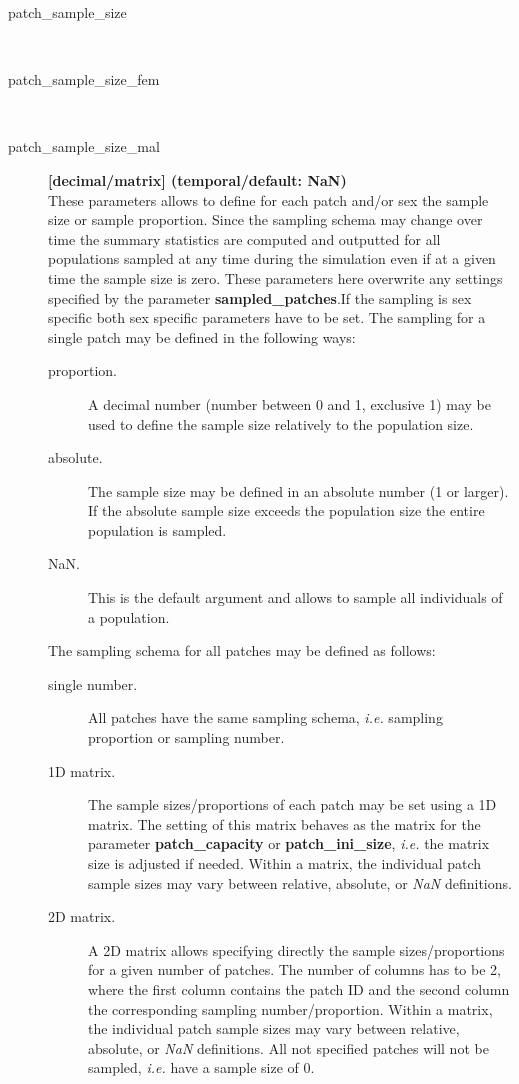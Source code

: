 \documentclass[letterpaper,12pt,oneside]{book}
\begin{document}
\begin{description}
\item[patch\_sample\_size]\hspace*{\fill}\\
\vspace{-9mm}
\item[patch\_sample\_size\_fem]\hspace*{\fill}\\
\vspace{-9mm}
\item[patch\_sample\_size\_mal]\textbf{[decimal/matrix] (temporal/default: NaN)}\\
These parameters allows to define for each patch and/or sex the sample size or sample proportion. Since the sampling schema may change over time the summary statistics are computed and outputted for all populations sampled at any time during the simulation even if at a given time the sample size is zero. These parameters here overwrite any settings specified by the parameter \textbf{sampled\_patches}.If the sampling is sex specific both sex specific parameters have to be set. The sampling for a single patch may be defined in the following ways:
\begin{description}
\item[proportion.] A decimal number (number between 0 and 1, exclusive 1) may be used to define the sample size relatively to the population size.
\item[absolute.] The sample size may be defined in an absolute number (1 or larger). If the absolute sample size exceeds the population size the entire population is sampled. 
\item[NaN.] This is the default argument and allows to sample all individuals of a population.
\end{description}

The sampling schema for all patches may be defined as follows:
\begin{description}
\item[single number.] All patches have the same sampling schema, \textit{i.e.} sampling proportion or sampling number.
\item[1D matrix.] The sample sizes/proportions of each patch may be set using a 1D matrix. The setting of this matrix behaves as the matrix for the parameter \textbf{patch\_capacity} or \textbf{patch\_ini\_size}, \textit{i.e.} the matrix size is adjusted if needed. Within a matrix, the individual patch sample sizes may vary between relative, absolute, or \textit{NaN} definitions. 
\item[2D matrix.] A 2D matrix allows specifying directly the sample sizes/proportions for a given number of patches. The number of columns has to be 2, where the first column contains the patch ID and the second column the corresponding sampling number/proportion. Within a matrix, the individual patch sample sizes may vary between relative, absolute, or \textit{NaN} definitions. All not specified patches will not be sampled, \textit{i.e.} have a sample size of 0.
\end{description}
\end{description}
\end{document}
